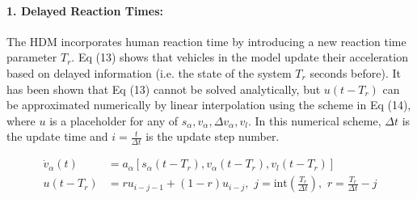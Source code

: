 \documentclass[12pt]{article}
\begin{document}
\paragraph{1. Delayed Reaction Times:}
The HDM incorporates human reaction time by introducing a new reaction time parameter $T_r$.  Eq (13) shows that vehicles in the model update their acceleration based on delayed information (i.e. the state of the system $T_r$ seconds before). It has been shown that Eq (13) cannot be solved analytically, but $u(t-T_r)$ can be approximated numerically by linear interpolation using the scheme in Eq (14), where $u$ is a placeholder for any of $s_\alpha,v_\alpha,\Delta v_\alpha,v_l$.  In this numerical scheme, $\Delta t$ is the update time and $i=\frac{t}{\Delta t}$ is the update step number.
\begin{mymathbox}[ams gather, title=Delayed Reaction Time Equations Equations,colframe=blue!30!black]
  \begin{align}
  \dot{v}_\alpha(t) &= a_{\alpha}\left[s_\alpha(t-T_r), v_\alpha(t-T_r), v_l(t-T_r) \right]\\
  u(t-T_r) &= ru_{i-j-1} + (1-r)u_{i-j},  \, \, j = \textrm{int}\left(\frac{T_r}{\Delta t} \right), \, \, r = \frac{T_r}{\Delta t} - j
  \end{align}
\end{mymathbox}
\end{document}

